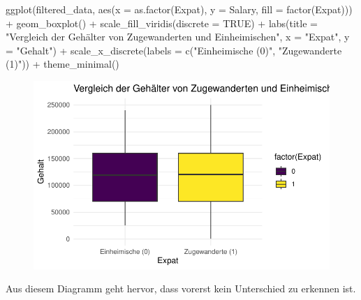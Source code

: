 \documentclass[
  letterpaper,
  DIV=11,
  numbers=noendperiod]{scrartcl}
\newenvironment{Shaded}{\begin{snugshade}}{\end{snugshade}}
\newcommand{\AttributeTok}[1]{\textcolor[rgb]{0.40,0.45,0.13}{#1}}
\newcommand{\ConstantTok}[1]{\textcolor[rgb]{0.56,0.35,0.01}{#1}}
\newcommand{\DecValTok}[1]{\textcolor[rgb]{0.68,0.00,0.00}{#1}}
\newcommand{\FunctionTok}[1]{\textcolor[rgb]{0.28,0.35,0.67}{#1}}
\newcommand{\NormalTok}[1]{\textcolor[rgb]{0.00,0.23,0.31}{#1}}
\newcommand{\OtherTok}[1]{\textcolor[rgb]{0.00,0.23,0.31}{#1}}
\newcommand{\SpecialCharTok}[1]{\textcolor[rgb]{0.37,0.37,0.37}{#1}}
\newcommand{\StringTok}[1]{\textcolor[rgb]{0.13,0.47,0.30}{#1}}
\begin{document}
\begin{Shaded}
\begin{Highlighting}[]
\FunctionTok{ggplot}\NormalTok{(filtered\_data, }\FunctionTok{aes}\NormalTok{(}\AttributeTok{x =} \FunctionTok{as.factor}\NormalTok{(Expat), }\AttributeTok{y =}\NormalTok{ Salary, }\AttributeTok{fill =} \FunctionTok{factor}\NormalTok{(Expat))) }\SpecialCharTok{+}
  \FunctionTok{geom\_boxplot}\NormalTok{() }\SpecialCharTok{+}
  \FunctionTok{scale\_fill\_viridis}\NormalTok{(}\AttributeTok{discrete =} \ConstantTok{TRUE}\NormalTok{) }\SpecialCharTok{+}
  \FunctionTok{labs}\NormalTok{(}\AttributeTok{title =} \StringTok{"Vergleich der Gehälter von Zugewanderten und Einheimischen"}\NormalTok{,}
       \AttributeTok{x =} \StringTok{"Expat"}\NormalTok{,}
       \AttributeTok{y =} \StringTok{"Gehalt"}\NormalTok{) }\SpecialCharTok{+}
  \FunctionTok{scale\_x\_discrete}\NormalTok{(}\AttributeTok{labels =} \FunctionTok{c}\NormalTok{(}\StringTok{"Einheimische (0)"}\NormalTok{, }\StringTok{"Zugewanderte (1)"}\NormalTok{)) }\SpecialCharTok{+}
  \FunctionTok{theme\_minimal}\NormalTok{()}
\end{Highlighting}
\end{Shaded}

\begin{figure}[H]

{\centering \includegraphics{main_doc_files/figure-pdf/unnamed-chunk-74-1.pdf}

}

\end{figure}

Aus diesem Diagramm geht hervor, dass vorerst kein Unterschied zu
erkennen ist.

\begin{Shaded}
\end{Shaded}
\end{document}
